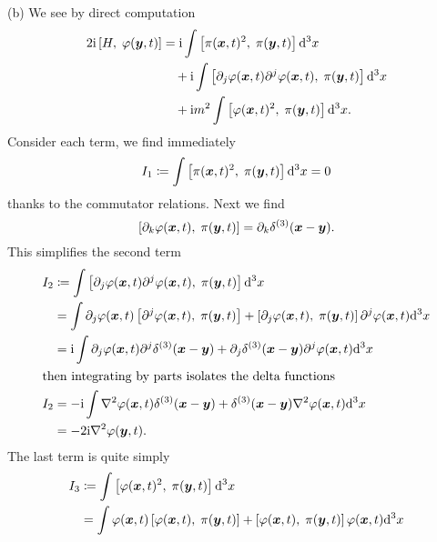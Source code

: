 \begin{soln}
(b) We see by direct computation
\begin{equation}
\begin{split}
2\I\commutator{H}{\varphi(\vec{y},t)}&=
 \I\int\commutator{\pi(\vec{x},t)^{2}}{\pi(\vec{y},t)}\D^{3}x\\
&\quad+\I\int\commutator{\partial_{j}\varphi(\vec{x},t)\partial^{j}\varphi(\vec{x},t)}{\pi(\vec{y},t)}\D^{3}x\\
&\quad+\I m^{2}\int\commutator{\varphi(\vec{x},t)^{2}}{\pi(\vec{y},t)}\D^{3}x.
\end{split}
\end{equation}
Consider each term, we find immediately
\begin{equation}
I_{1}\eqDef\int\commutator{\pi(\vec{x},t)^{2}}{\pi(\vec{y},t)}\D^{3}x=0
\end{equation}
thanks to the commutator relations. Next we find
\begin{equation}
\commutator{\partial_{k}\varphi(\vec{x},t)}{\pi(\vec{y},t)}=\partial_{k}\delta^{(3)}(\vec{x}-\vec{y}).
\end{equation}
This simplifies the second term
\begin{subequations}
\begin{align}
I_{2}&\eqDef\int\commutator{\partial_{j}\varphi(\vec{x},t)\partial^{j}\varphi(\vec{x},t)}{\pi(\vec{y},t)}\D^{3}x\\
&=\int\partial_{j}\varphi(\vec{x},t)\commutator{\partial^{j}\varphi(\vec{x},t)}{\pi(\vec{y},t)}+\commutator{\partial_{j}\varphi(\vec{x},t)}{\pi(\vec{y},t)}\partial^{j}\varphi(\vec{x},t)\D^{3}x\\
&=\I\int\partial_{j}\varphi(\vec{x},t)\partial^{j}\delta^{(3)}(\vec{x}-\vec{y})+\partial_{j}\delta^{(3)}(\vec{x}-\vec{y})\partial^{j}\varphi(\vec{x},t)\D^{3}x\\
\intertext{then integrating by parts isolates the delta functions}
I_{2}&=-\I\int\nabla^{2}\varphi(\vec{x},t)\delta^{(3)}(\vec{x}-\vec{y})+\delta^{(3)}(\vec{x}-\vec{y})\nabla^{2}\varphi(\vec{x},t)\D^{3}x\\
&=-2\I\nabla^{2}\varphi(\vec{y},t).
\end{align}
\end{subequations}
The last term is quite simply
\begin{subequations}
\begin{align}
I_{3} &\eqDef\int\commutator{\varphi(\vec{x},t)^{2}}{\pi(\vec{y},t)}\D^{3}x\\
&=\int\varphi(\vec{x},t)\commutator{\varphi(\vec{x},t)}{\pi(\vec{y},t)}+\commutator{\varphi(\vec{x},t)}{\pi(\vec{y},t)}\varphi(\vec{x},t)\D^{3}x\\

\end{align}
\end{subequations}
\end{soln}
